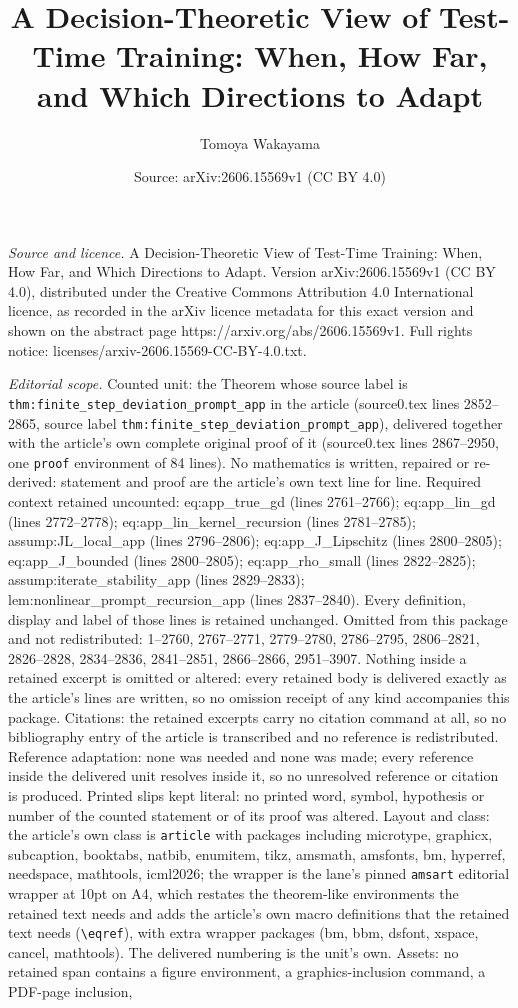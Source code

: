 \documentclass[10pt,a4paper]{amsart}
\title[A Decision-Theoretic View of Test-Time Training: When, How F]{A Decision-Theoretic View of Test-Time Training: When, How Far, and Which Directions to Adapt}
\author{Tomoya Wakayama}
\date{Source: arXiv:2606.15569v1 (CC BY 4.0)}
\begin{document}
\maketitle

\noindent\emph{Source and licence.} A Decision-Theoretic View of Test-Time Training: When, How Far, and Which Directions to Adapt. Version arXiv:2606.15569v1 (CC BY 4.0), distributed under the Creative Commons Attribution 4.0 International licence, as recorded in the arXiv licence metadata for this exact version and shown on the abstract page https://arxiv.org/abs/2606.15569v1. Full rights notice: licenses/arxiv-2606.15569-CC-BY-4.0.txt.\par\smallskip

\noindent\textit{Editorial scope.} Counted unit: the Theorem whose source label is \texttt{thm:finite\_step\_deviation\_prompt\_app} in the article (source0.tex lines 2852--2865, source label \texttt{thm:finite\_step\_deviation\_prompt\_app}), delivered together with the article's own complete original proof of it (source0.tex lines 2867--2950, one \texttt{proof} environment of 84 lines). No mathematics is written, repaired or re-derived: statement and proof are the article's own text line for line. Required context retained uncounted: eq:app\_true\_gd (lines 2761--2766); eq:app\_lin\_gd (lines 2772--2778); eq:app\_lin\_kernel\_recursion (lines 2781--2785); assump:JL\_local\_app (lines 2796--2806); eq:app\_J\_Lipschitz (lines 2800--2805); eq:app\_J\_bounded (lines 2800--2805); eq:app\_rho\_small (lines 2822--2825); assump:iterate\_stability\_app (lines 2829--2833); lem:nonlinear\_prompt\_recursion\_app (lines 2837--2840). Every definition, display and label of those lines is retained unchanged. Omitted from this package and not redistributed: 1--2760, 2767--2771, 2779--2780, 2786--2795, 2806--2821, 2826--2828, 2834--2836, 2841--2851, 2866--2866, 2951--3907. Nothing inside a retained excerpt is omitted or altered: every retained body is delivered exactly as the article's lines are written, so no omission receipt of any kind accompanies this package. Citations: the retained excerpts carry no citation command at all, so no bibliography entry of the article is transcribed and no reference is redistributed. Reference adaptation: none was needed and none was made; every reference inside the delivered unit resolves inside it, so no unresolved reference or citation is produced. Printed slips kept literal: no printed word, symbol, hypothesis or number of the counted statement or of its proof was altered. Layout and class: the article's own class is \texttt{article} with packages including microtype, graphicx, subcaption, booktabs, natbib, enumitem, tikz, amsmath, amsfonts, bm, hyperref, needspace, mathtools, icml2026; the wrapper is the lane's pinned \texttt{amsart} editorial wrapper at 10pt on A4, which restates the theorem-like environments the retained text needs and adds the article's own macro definitions that the retained text needs (\texttt{\textbackslash eqref}), with extra wrapper packages (bm, bbm, dsfont, xspace, cancel, mathtools). The delivered numbering is the unit's own. Assets: no retained span contains a figure environment, a graphics-inclusion command, a PDF-page inclusion, 
\end{document}
